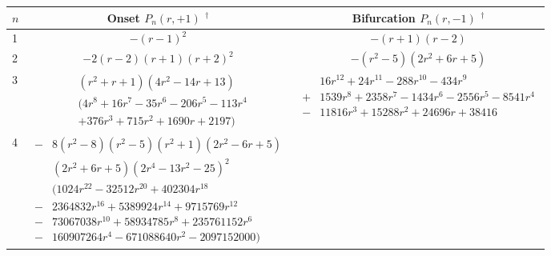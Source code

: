\documentclass{ws-ijbc}
\begin{document}
\begin{table}[h]\footnotesize
\tbl{
Onset and bifurcation polynomials of the $n$-cycles of the cubic map \refeq{cubic}.}
{
\begin{tabular*}{\linewidth}{l c c}
\hline
$n$
&
Onset $P_n(r, +1)$ $^\dagger$
&
Bifurcation $P_n(r, -1)$ $^\dagger$
\\
\hline
1
&
$-(r-1)^2$
&
$-(r+1)(r-2)$
\\
2
&
$-2 (r-2) (r+1) (r+2)^2$
&
$-(r^2-5) (2 r^2+6 r+5)$
\\
3
&
\begin{minipage}{.45\linewidth}
\vspace{3mm}
$\begin{aligned}
&(r^2+r+1) (4 r^2-14 r+13) \\
&(4 r^8+16 r^7-35 r^6-206 r^5-113 r^4\\
&+376 r^3+715 r^2+1690 r+2197)
\end{aligned}$
\vspace{1mm}
\end{minipage}
&
\begin{minipage}{.5\linewidth}
\vspace{3mm}
$\begin{aligned}
&16 r^{12}+24 r^{11}-288 r^{10}-434 r^9\\
+&1539 r^8+2358 r^7-1434 r^6-2556 r^5-8541 r^4\\
-&11816 r^3+15288 r^2+24696 r+38416
\end{aligned}$
\vspace{1mm}
\end{minipage}
\\
4
&
\begin{minipage}{.45\linewidth}
\vspace{3mm}
$\begin{aligned}
-&8(r^2-8) (r^2-5) (r^2+1) (2 r^2-6 r+5) \\
&(2 r^2+6 r+5) (2 r^4-13 r^2-25)^2 \\
&(1024 r^{22}-32512 r^{20}+402304 r^{18} \\
-&2364832 r^{16}+5389924 r^{14}+9715769 r^{12} \\
-&73067038 r^{10}+58934785 r^{8}+235761152 r^6 \\
-&160907264 r^4-671088640 r^2-2097152000)
\end{aligned}$
\vspace{3mm}
\end{minipage}

\end{tabular*}}
\end{table}
\end{document}
